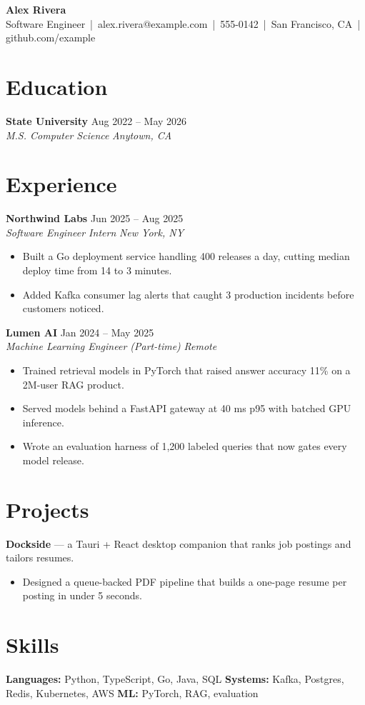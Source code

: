 \documentclass[10.5pt,letterpaper]{article}
\newcommand{\role}[4]{\textbf{#1} \hfill #2\\ \textit{#3} \hfill \textit{#4}}
\begin{document}
\begin{center}
{\LARGE\bfseries Alex Rivera}\\[3pt]
Software Engineer \,|\, alex.rivera@example.com \,|\, 555-0142 \,|\, San Francisco, CA \,|\, github.com/example
\end{center}

\section{Education}
\role{State University}{Aug 2022 -- May 2026}{M.S. Computer Science}{Anytown, CA}

\section{Experience}
\role{Northwind Labs}{Jun 2025 -- Aug 2025}{Software Engineer Intern}{New York, NY}
\begin{itemize}
  \item Built a Go deployment service handling 400 releases a day, cutting median deploy time from 14 to 3 minutes.
  \item Added Kafka consumer lag alerts that caught 3 production incidents before customers noticed.
\end{itemize}
\role{Lumen AI}{Jan 2024 -- May 2025}{Machine Learning Engineer (Part-time)}{Remote}
\begin{itemize}
  \item Trained retrieval models in PyTorch that raised answer accuracy 11\% on a 2M-user RAG product.
  \item Served models behind a FastAPI gateway at 40 ms p95 with batched GPU inference.
  \item Wrote an evaluation harness of 1,200 labeled queries that now gates every model release.
\end{itemize}

\section{Projects}
\textbf{Dockside} --- a Tauri + React desktop companion that ranks job postings and tailors resumes.
\begin{itemize}
  \item Designed a queue-backed PDF pipeline that builds a one-page resume per posting in under 5 seconds.
\end{itemize}

\section{Skills}
\textbf{Languages:} Python, TypeScript, Go, Java, SQL \quad
\textbf{Systems:} Kafka, Postgres, Redis, Kubernetes, AWS \quad
\textbf{ML:} PyTorch, RAG, evaluation
\end{document}
